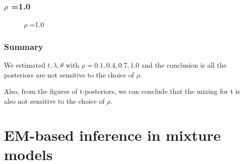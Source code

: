 \documentclass{article}
\begin{document}
\subsubsection{$\rho$ =1.0 }
\begin{figure}[H]
    \centering
    \caption{$\rho$ =1.0}
\end{figure}

\subsubsection{Summary}

We estimated $t,\lambda,\theta$ with $\rho = 0.1,0.4,0.7,1.0$ and the conclusion is all the posteriors are not sensitive to the choice of $\rho$.

Also, from the figures of t-posteriors, we can conclude that the mixing for t is also not sensitive to the choice of $\rho$.

\section{EM-based inference in mixture models}
\end{document}
